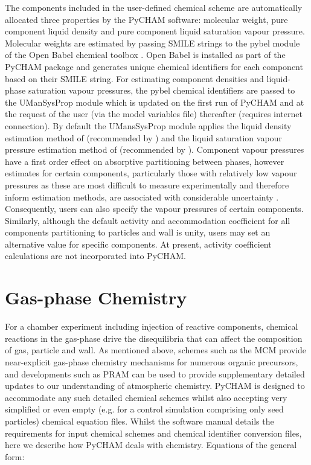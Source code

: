 \documentclass[gmd, manuscript]{copernicus}
\begin{document}
The components included in the user-defined chemical scheme are automatically allocated three properties by the PyCHAM software: molecular weight, pure component liquid density and pure component liquid saturation vapour pressure.  Molecular weights are  estimated by passing SMILE strings to the pybel module of the Open Babel chemical toolbox \citep{OBoyle2011}.  Open Babel is installed as part of the PyCHAM package and generates unique chemical identifiers for each component based on their SMILE string.  For estimating component densities and liquid-phase saturation vapour pressures, the pybel chemical identifiers are passed to the UManSysProp module \citep{Topping2016} which is updated on the first run of PyCHAM and at the request of the user (via the model variables file) thereafter (requires internet connection).  By default the UMansSysProp module applies the liquid density estimation method of \citet{Girolami1994} (recommended by \citet{Barley2013}) and the liquid saturation vapour pressure estimation method of \citet{Nannoolal2008} (recommended by \citet{OMeara2014}).  Component vapour pressures have a first order effect on absorptive partitioning between phases, however estimates for certain components, particularly those with relatively low vapour pressures as these are most difficult to measure experimentally and therefore inform estimation methods,  are associated with considerable uncertainty \citep{OMeara2014}.  Consequently, users can also specify the vapour pressures of certain components.  Similarly, although the default activity and accommodation coefficient for all components partitioning to particles and wall is unity, users may set an alternative value for specific components.  At present, activity coefficient calculations are not incorporated into PyCHAM.

\section{Gas-phase Chemistry}\label{sec:photochem}

For a chamber experiment including injection of reactive components, chemical reactions in the gas-phase drive the disequilibria that can affect the composition of gas, particle and wall.  As mentioned above, schemes such as the MCM provide near-explicit gas-phase chemistry mechanisms for numerous organic precursors, and developments such as PRAM \citep{Roldin2019} can be used to provide supplementary detailed updates to our understanding of atmospheric chemistry.  PyCHAM is designed to accommodate any such detailed chemical schemes whilst also accepting very simplified or even empty (e.g. for a control simulation comprising only seed particles) chemical equation files.  Whilst the software manual details the requirements for input chemical schemes and chemical identifier conversion files, here we describe how PyCHAM deals with chemistry.  Equations of the general form:
\end{document}
